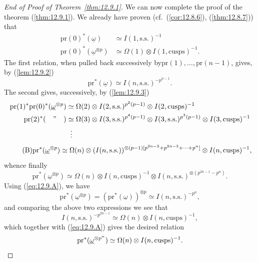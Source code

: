 \begin{proof}[End of Proof of Theorem~\ref{thm:12.9.1}]
We can now complete the proof of the theorem (\ref{thm:12.9.1}). We already have proven (cf.~(\ref{cor:12.8.6}), (\ref{thm:12.8.7})) that
\begin{align*}
\mathrm{pr}(0)^*(\underline{\omega}) &\simeq I(1, \mathrm{s.s.})^{-1} \\
\mathrm{pr}(0)^*(\underline{\omega}^{\otimes p}) &\simeq \Omega(1) \otimes I(1, \mathrm{cusps})^{-1} .
\end{align*}
The first relation, when pulled back successively by\linebreak $\mathrm{pr}(1), \ldots, \mathrm{pr}(n-1)$, gives, by (\ref{lem:12.9.2})
\begin{equation}\tag{A}\label{eq:12.9.A}
\mathrm{pr}^*(\underline{\omega}) \simeq I(n, \mathrm{s.s.})^{-p^{n-1}} .
\end{equation}
The second gives, successively, by (\ref{lem:12.9.3})
\[
\resizebox{\linewidth}{!}{$\displaystyle
\begin{aligned}
\mathrm{pr}(1)^*\mathrm{pr}(0)^*(\underline{\omega}^{\otimes p}) &\simeq \Omega(2) \otimes I(2, \mathrm{s.s.})^{p^2(p-1)} \otimes I(2, \mathrm{cusps})^{-1} \\
\mathrm{pr}(2)^*(\text{\quad ''\quad }) &\simeq \Omega(3) \otimes I(3, \mathrm{s.s.})^{p^4(p-1)} \otimes I(3, \mathrm{s.s.})^{p^3(p-1)} \otimes I(3, \mathrm{cusps})^{-1} \\
&\;\;\vdots
\end{aligned}
$}
\]
\begin{equation}\tag{B}\label{eq:12.9.B}
\resizebox{0.91\linewidth}{!}{$\displaystyle
\mathrm{pr}^*(\underline{\omega}^{\otimes p}) \simeq \Omega(n) \otimes (I(n, \mathrm{s.s.}))^{\otimes(p-1)[p^{2n-2} + p^{2n-3} + \cdots + p^n]} \otimes I(n, \mathrm{cusps})^{-1} ,
$}
\end{equation}
whence finally
\[
\mathrm{pr}^*(\underline{\omega}^{\otimes p}) \simeq \Omega(n) \otimes I(n, \mathrm{cusps})^{-1} \otimes I(n, \mathrm{s.s.})^{\otimes(p^{2n-1} - p^n)} .
\]
Using (\ref{eq:12.9.A}), we have
\[
\mathrm{pr}^*(\underline{\omega}^{\otimes p}) = (\mathrm{pr}^*(\underline{\omega}))^{\otimes p} \simeq I(n, \mathrm{s.s.})^{-p^n} ,
\]
and comparing the above two expressions we see that
\[
I(n, \mathrm{s.s.})^{-p^{2n-1}} \simeq \Omega(n) \otimes I(n, \mathrm{cusps})^{-1} ,
\]
which together with (\ref{eq:12.9.A}) gives the desired relation
\[
\mathrm{pr}^*(\underline{\omega}^{\otimes p^n}) \simeq \Omega(n) \otimes I(n, \mathrm{cusps})^{-1} . \qedhere
\]
\end{proof}

